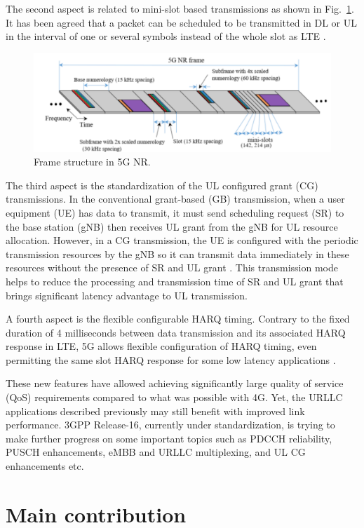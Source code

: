 \documentclass{report}
\begin{document}
The second aspect is related to mini-slot based transmissions as shown in Fig.~\ref{fig33}. It has been agreed that a packet can be scheduled to be transmitted in DL or UL in the interval of one or several symbols instead of the whole slot as LTE \cite{ad7}.

\begin{figure}[htbp]
\centerline{\includegraphics[scale=0.35]{fig33.png}}
\caption{Frame structure in 5G NR.}
\label{fig33}
\end{figure}

The third aspect is the standardization of the UL configured grant (CG) transmissions. In the conventional grant-based (GB) transmission, when a user equipment (UE) has data to transmit, it must send scheduling request (SR) to the base station (gNB) then receives UL grant from the gNB for UL resource allocation. However, in a CG transmission, the UE is configured with the periodic transmission resources by the gNB so it can transmit data immediately in these resources without the presence of SR and UL grant \cite{ad3}. This transmission mode helps to reduce the processing and transmission time of SR and UL grant that brings significant latency advantage to UL transmission.

A fourth aspect is the flexible configurable HARQ timing. Contrary to the fixed duration of 4 milliseconds between data transmission and its associated HARQ response in LTE, 5G allows flexible configuration of HARQ timing, even permitting the same slot HARQ response for some low latency applications \cite{ad23}.

These new features have allowed achieving significantly large quality of service (QoS) requirements compared to what was possible with 4G. Yet, the URLLC applications described previously may still benefit with improved link performance. 3GPP Release-16, currently under standardization, is trying to make further progress on some important topics such as PDCCH reliability, PUSCH enhancements, eMBB and URLLC multiplexing, and UL CG enhancements etc. 

\section{Main contribution}
\end{document}
